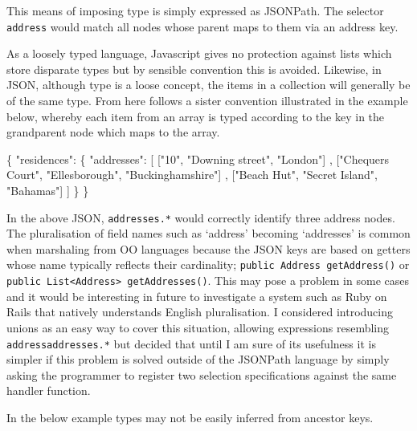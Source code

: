 \documentclass[12pt, ]{article}
\newenvironment{Shaded}{}{}
\newcommand{\StringTok}[1]{\textcolor[rgb]{0.25,0.44,0.63}{{#1}}}
\newcommand{\NormalTok}[1]{{#1}}
\begin{document}
This means of imposing type is simply expressed as JSONPath. The
selector \texttt{address} would match all nodes whose parent maps to
them via an address key.

As a loosely typed language, Javascript gives no protection against
lists which store disparate types but by sensible convention this is
avoided. Likewise, in JSON, although type is a loose concept, the items
in a collection will generally be of the same type. From here follows a
sister convention illustrated in the example below, whereby each item
from an array is typed according to the key in the grandparent node
which maps to the array.

\begin{Shaded}
\begin{Highlighting}[]
\NormalTok{\{}
   \StringTok{"residences"}\NormalTok{: \{}
      \StringTok{"addresses"}\NormalTok{: [}
         \NormalTok{[}\StringTok{"10"}\NormalTok{, }\StringTok{"Downing street"}\NormalTok{, }\StringTok{"London"}\NormalTok{]}
      \NormalTok{,  [}\StringTok{"Chequers Court"}\NormalTok{, }\StringTok{"Ellesborough"}\NormalTok{, }\StringTok{"Buckinghamshire"}\NormalTok{]      }
      \NormalTok{,  [}\StringTok{"Beach Hut"}\NormalTok{, }\StringTok{"Secret Island"}\NormalTok{, }\StringTok{"Bahamas"}\NormalTok{]}
      \NormalTok{]}
   \NormalTok{\}}
\NormalTok{\}}
\end{Highlighting}
\end{Shaded}

In the above JSON, \texttt{addresses.*} would correctly identify three
address nodes. The pluralisation of field names such as `address'
becoming `addresses' is common when marshaling from OO languages because
the JSON keys are based on getters whose name typically reflects their
cardinality; \texttt{public Address getAddress()} or
\texttt{public List\textless{}Address\textgreater{} getAddresses()}.
This may pose a problem in some cases and it would be interesting in
future to investigate a system such as Ruby on Rails that natively
understands English pluralisation. I considered introducing unions as an
easy way to cover this situation, allowing expressions resembling
\texttt{address\textbar{}addresses.*} but decided that until I am sure
of its usefulness it is simpler if this problem is solved outside of the
JSONPath language by simply asking the programmer to register two
selection specifications against the same handler function.

In the below example types may not be easily inferred from ancestor
keys.
\end{document}
